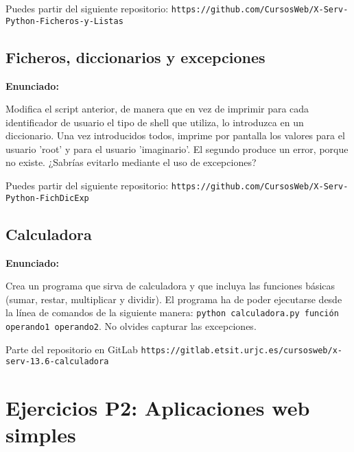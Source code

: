 Puedes partir del siguiente repositorio: \verb|https://github.com/CursosWeb/X-Serv-Python-Ficheros-y-Listas|

\subsection{Ficheros, diccionarios y excepciones}
\label{subsec:ficheros-dic-excep}

\textbf{Enunciado:}

Modifica el script
anterior, de manera que en vez de imprimir para cada identificador de usuario el tipo
de shell que utiliza, lo introduzca en un diccionario. Una vez introducidos todos, imprime por pantalla los valores para el usuario 'root' y para el
usuario 'imaginario'. El segundo produce un error, porque no existe. ¿Sabrías evitarlo mediante el uso de
excepciones?

Puedes partir del siguiente repositorio: \verb|https://github.com/CursosWeb/X-Serv-Python-FichDicExp|

\subsection{Calculadora}
\label{subsec:calculadora}

\textbf{Enunciado:}

Crea un programa que sirva de calculadora y que incluya las funciones
básicas (sumar, restar, multiplicar y dividir). El programa ha de poder ejecutarse desde la línea de comandos de la siguiente manera: \texttt{python calculadora.py
función operando1 operando2}. No olvides capturar las excepciones.

Parte del repositorio en GitLab \verb|https://gitlab.etsit.urjc.es/cursosweb/x-serv-13.6-calculadora|

\newpage

\section{Ejercicios P2: Aplicaciones web simples}

